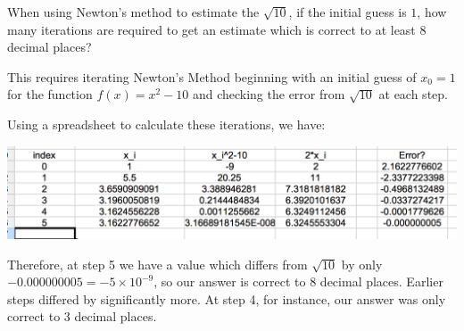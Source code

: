 \documentclass{ximera}
\author{Emma Smith Zbarsky}
\begin{document}
\begin{exercise}

When using Newton's method to estimate the $\sqrt{10}$, if the initial
guess is $1$, how many iterations are required to get an estimate which
is correct to at least 8 decimal places?


\begin{hint}
This requires iterating Newton's Method beginning with an initial guess
of $x_0=1$ for the function $f(x) = x^2-10$ and checking the error from
$\sqrt{10}$ at each step.
\end{hint}


\begin{hint}
Using a spreadsheet to calculate these iterations, we have:


\begin{image}\includegraphics{newtonsmethod-iterates.png}\end{image}

 Therefore, at step 5 we have a value
which differs from $\sqrt{10}$ by only
$-0.000000005 = -5\times 10^{-9}$, so our answer is correct to 8 decimal
places. Earlier steps differed by significantly more. At step 4, for
instance, our answer was only correct to 3 decimal places.
\end{hint}


\begin{multipleChoice}
\end{multipleChoice}

\end{exercise}
\end{document}
